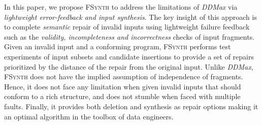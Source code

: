 \documentclass[sigconf,review,anonymous]{acmart}
\newcounter{todocounter}
\newcommand{\todo}[1]{\marginpar{$|$}\textcolor{red}{\stepcounter{todocounter}\footnote[\thetodocounter]{\textcolor{red}{\textbf{TODO }}\textit{#1}}}}
\renewcommand{\todo}[1]{}
\newcommand{\approach}{\textsc{FSynth}\xspace}
\newcommand{\ddmax}{\textit{DDMax}\xspace}
\newcommand{\brepair}{\textsc{FSynth}\xspace}
\begin{document}
In this paper, we propose \brepair to address the %
limitations of \ddmax via \textit{lightweight error-feedback and input synthesis}. The key insight of this approach is to complete \textit{semantic} repair of invalid inputs using lightweight failure feedback such as the \textit{validity, incompleteness and incorrectness} checks of input fragments. Given an invalid input and a conforming program, \approach performs test experiments of input subsets and candidate insertions to provide a set of repairs prioritized by the distance of the repair from the original input.
Unlike \ddmax, \brepair does not have the implied assumption of independence of
fragments. Hence, it does not face any limitation when given invalid inputs
that should conform to a rich structure, and %
does not stumble when faced
with multiple faults. Finally, it %
provides both deletion and
synthesis as repair options making it an optimal algorithm in the toolbox of
data engineers.

%
\end{document}
